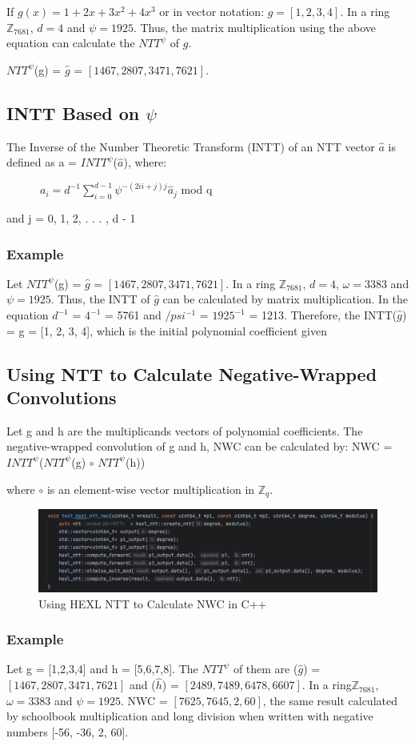 \documentclass{techrep}
\theoremstyle{definition}
\theoremstyle{plain}
\newcommand{\Z}{\mathbb{Z}}
\begin{document}
	If $g(x) = 1 + 2x + 3x^2 + 4x^3$ or in vector notation:  $g = [1, 2, 3, 4]$.
	In a ring $\Z_{7681}$, $d = 4$ and $\psi =1925$. Thus, the matrix multiplication using the above equation can calculate the ${NTT}^\psi$ of $g$.

	${NTT}^\psi$(g) = $\hat{g}$ = $[1467, 2807, 3471, 7621]$.

	\subsection{INTT Based on $\psi$}
	The Inverse of the Number Theoretic Transform (INTT) of an NTT vector $\hat{a}$ is defined as a = ${INTT}^\psi$($\hat{a}$), where:

	$\quad \quad \quad a_i = d^{-1}\sum_{i=0}^{d - 1}\psi^{-(2ii+j)j}\hat{a}_j$ mod q

	and j = 0, 1, 2, . . . , d - 1

	\subsubsection{Example}

	Let ${NTT}^\psi$(g) = $\hat{g}$ = $[1467,2807,3471,7621]$. In a ring $\Z_{7681}$, $d = 4$, $\omega =3383$ and $\psi =1925$. Thus, the INTT of $\hat{g}$ can be calculated by matrix multiplication. In the equation $d^{-1}$ = $4^{-1}$ = 5761 and $/psi^{-1}$ = ${1925}^{-1}$ = 1213. Therefore, the INTT($\hat{g}$) = g = [1, 2, 3, 4], which is the initial polynomial coefficient given

	\subsection{Using NTT to Calculate Negative-Wrapped Convolutions}

	Let g and h are the multiplicands vectors of polynomial coefficients. The negative-wrapped convolution of g and h, NWC can be calculated by:
	NWC = ${INTT}^\psi$(${NTT}^\psi$(g) $\circ$ ${NTT}^\psi$(h))

	where $\circ$ is an element-wise vector multiplication in $\Z_{q}$.


	\begin{figure}[H]
		\centering
		\includegraphics[width=.9\columnwidth]{fig/hexl_ntt_nwc.png}
		\caption{Using HEXL NTT to Calculate NWC in C++}
		\label{fig:hexl_ntt_nwc}
	\end{figure}

	\subsubsection{Example}
	Let g = [1,2,3,4] and h = [5,6,7,8]. The ${NTT}^\psi$ of them are ($\hat{g}$) = $[1467,2807,3471,7621]$ and ($\hat{h}$) = $[2489,7489,6478,6607]$. In a ring$\Z_{7681}$, $\omega =3383$ and $\psi =1925$. NWC = $[7625, 7645, 2, 60]$, the same result calculated by schoolbook multiplication and long division when written with negative numbers [-56, -36, 2, 60].
\end{document}
